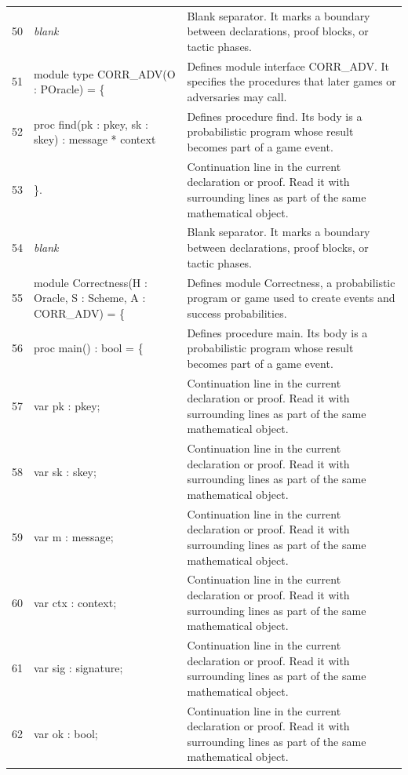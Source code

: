 \documentclass[10pt]{article}
\begin{document}
\begin{longtable}{r L{0.53\textwidth} L{0.37\textwidth}}
50 & {\ttfamily\scriptsize \emph{blank}} & Blank separator.  It marks a boundary between declarations, proof blocks, or tactic phases. \\
51 & {\ttfamily\scriptsize module type CORR\_ADV(O : POracle) = \{} & Defines module interface CORR\_ADV.  It specifies the procedures that later games or adversaries may call. \\
52 & {\ttfamily\scriptsize   proc find(pk : pkey, sk : skey) : message * context} & Defines procedure find.  Its body is a probabilistic program whose result becomes part of a game event. \\
53 & {\ttfamily\scriptsize \}.} & Continuation line in the current declaration or proof.  Read it with surrounding lines as part of the same mathematical object. \\
54 & {\ttfamily\scriptsize \emph{blank}} & Blank separator.  It marks a boundary between declarations, proof blocks, or tactic phases. \\
55 & {\ttfamily\scriptsize module Correctness(H : Oracle, S : Scheme, A : CORR\_ADV) = \{} & Defines module Correctness, a probabilistic program or game used to create events and success probabilities. \\
56 & {\ttfamily\scriptsize   proc main() : bool = \{} & Defines procedure main.  Its body is a probabilistic program whose result becomes part of a game event. \\
57 & {\ttfamily\scriptsize     var pk : pkey;} & Continuation line in the current declaration or proof.  Read it with surrounding lines as part of the same mathematical object. \\
58 & {\ttfamily\scriptsize     var sk : skey;} & Continuation line in the current declaration or proof.  Read it with surrounding lines as part of the same mathematical object. \\
59 & {\ttfamily\scriptsize     var m : message;} & Continuation line in the current declaration or proof.  Read it with surrounding lines as part of the same mathematical object. \\
60 & {\ttfamily\scriptsize     var ctx : context;} & Continuation line in the current declaration or proof.  Read it with surrounding lines as part of the same mathematical object. \\
61 & {\ttfamily\scriptsize     var sig : signature;} & Continuation line in the current declaration or proof.  Read it with surrounding lines as part of the same mathematical object. \\
62 & {\ttfamily\scriptsize     var ok : bool;} & Continuation line in the current declaration or proof.  Read it with surrounding lines as part of the same mathematical object. \\

\end{longtable}
\end{document}
